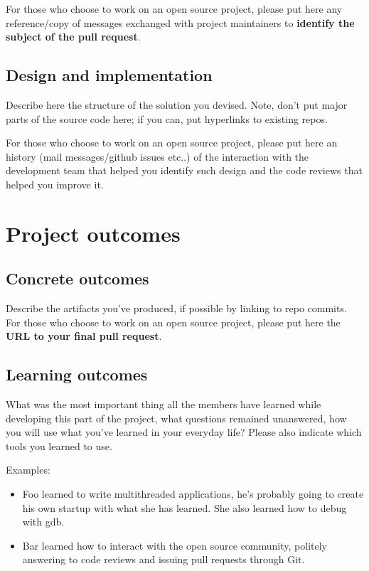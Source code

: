 \documentclass[10pt,a4]{article}
\begin{document}
For those who choose to work on an open source project, please put here any
reference/copy of messages exchanged with project maintainers to \textbf{identify the subject
of the pull request}.

\subsection{Design and implementation}
Describe here the structure of the solution you devised. Note, don't put major
parts of the source code here; if you can, put hyperlinks to existing repos.

For those who choose to work on an open source project, please put here an
history (mail messages/github issues etc..) of the interaction with the
development team that helped you identify such design and the code reviews that
helped you improve it.

\section{Project outcomes}

\subsection{Concrete outcomes}
Describe the artifacts you've produced, if possible by linking to repo commits.
For those who choose to work on an open source project, please put here the 
\textbf{URL to your final pull request}.

\subsection{Learning outcomes}

What was the most important thing all the members have learned while
developing this part of the project, what questions remained unanswered,
how you will use what you've learned in your everyday life?
Please also indicate which tools you learned to use.

Examples:

\begin{itemize}
\item Foo learned to write multithreaded applications, he's probably going to
  create his own startup with what she has learned. She also learned how to
  debug with gdb.
\item Bar learned how to interact with the open source community, politely
  answering to code reviews and issuing pull requests through Git.
\end{itemize}
\end{document}

